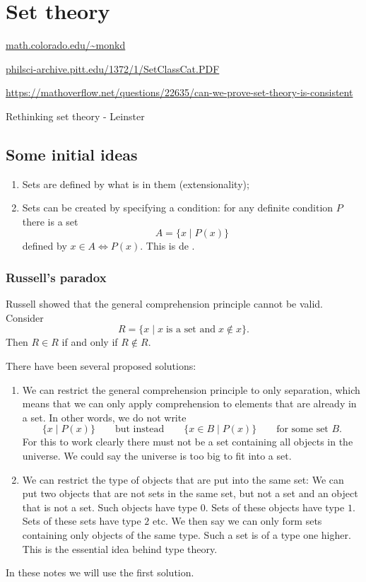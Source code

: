 \chapter{Set theory}
\url{math.colorado.edu/~monkd}

\url{philsci-archive.pitt.edu/1372/1/SetClassCat.PDF}

\url{https://mathoverflow.net/questions/22635/can-we-prove-set-theory-is-consistent}

Rethinking set theory - Leinster




\section{Some initial ideas}
\begin{enumerate}
\item Sets are defined by what is in them (extensionality);
\item Sets can be created by specifying a condition: for any definite condition $P$ there is a set
\[ A = \{x\;|\;P(x)\} \]
defined by $x\in A \iff P(x)$. This is de .
\end{enumerate}
\subsection{Russell's paradox}
Russell showed that the general comprehension principle cannot be valid. Consider
\[ R = \{x\;|\; x\;\text{is a set and}\;x\notin x\}. \]
Then $R\in R$ if and only if $R\notin R$.

There have been several proposed solutions:
\begin{enumerate}
\item We can restrict the general comprehension principle to only separation, which means that we can only apply comprehension to elements that are already in a set. In other words, we do not write
\[ \{ x\;|\; P(x) \} \qquad \text{but instead}\qquad \{ x\in B\;|\; P(x) \}\qquad \text{for some set $B$}. \]
For this to work clearly there must not be a set containing all objects in the universe. We could say the universe is too big to fit into a set.
\item We can restrict the type of objects that are put into the same set: We can put two objects that are not sets in the same set, but not a set and an object that is not a set. Such objects have type $0$. Sets of these objects have type $1$. Sets of these sets have type $2$ etc. We then say we can only form sets containing only objects of the same type. Such a set is of a type one higher. This is the essential idea behind type theory.
\end{enumerate}
In these notes we will use the first solution.

